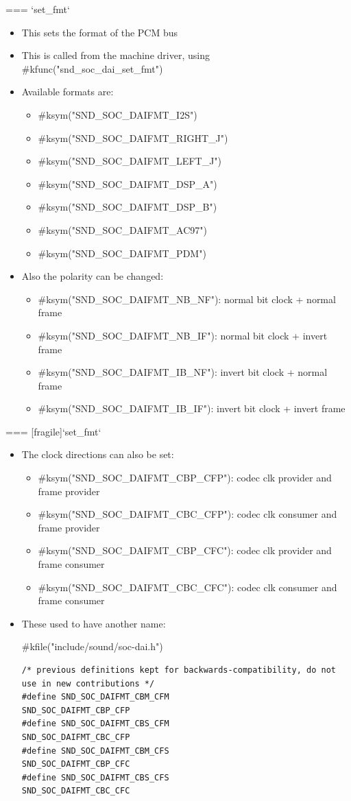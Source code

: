 === {`set_fmt`}
  \begin{itemize}
  \item This sets the format of the PCM bus
  \item This is called from the machine driver, using
    #kfunc("snd_soc_dai_set_fmt")
  \item Available formats are:
    \begin{itemize}
    \item #ksym("SND_SOC_DAIFMT_I2S")
    \item #ksym("SND_SOC_DAIFMT_RIGHT_J")
    \item #ksym("SND_SOC_DAIFMT_LEFT_J")
    \item #ksym("SND_SOC_DAIFMT_DSP_A")
    \item #ksym("SND_SOC_DAIFMT_DSP_B")
    \item #ksym("SND_SOC_DAIFMT_AC97")
    \item #ksym("SND_SOC_DAIFMT_PDM")
    \end{itemize}
  \item Also the polarity can be changed:
    \begin{itemize}
    \item #ksym("SND_SOC_DAIFMT_NB_NF"): normal bit clock + normal frame
    \item #ksym("SND_SOC_DAIFMT_NB_IF"): normal bit clock + invert frame
    \item #ksym("SND_SOC_DAIFMT_IB_NF"): invert bit clock + normal frame
    \item #ksym("SND_SOC_DAIFMT_IB_IF"): invert bit clock + invert frame
    \end{itemize}
  \end{itemize}


=== [fragile]{`set_fmt`}
  \begin{itemize}
  \item The clock directions can also be set:
    \begin{itemize}
    \item #ksym("SND_SOC_DAIFMT_CBP_CFP"): codec clk provider and frame provider
    \item #ksym("SND_SOC_DAIFMT_CBC_CFP"): codec clk consumer and frame provider
    \item #ksym("SND_SOC_DAIFMT_CBP_CFC"): codec clk provider and frame consumer
    \item #ksym("SND_SOC_DAIFMT_CBC_CFC"): codec clk consumer and frame consumer
    \end{itemize}
  \item These used to have another name:
  \begin{block}{#kfile("include/sound/soc-dai.h")}
    \fontsize{9}{9}\selectfont
    \begin{verbatim}
/* previous definitions kept for backwards-compatibility, do not use in new contributions */
#define SND_SOC_DAIFMT_CBM_CFM                SND_SOC_DAIFMT_CBP_CFP
#define SND_SOC_DAIFMT_CBS_CFM                SND_SOC_DAIFMT_CBC_CFP
#define SND_SOC_DAIFMT_CBM_CFS                SND_SOC_DAIFMT_CBP_CFC
#define SND_SOC_DAIFMT_CBS_CFS                SND_SOC_DAIFMT_CBC_CFC
    \end{verbatim}
  \end{block}
  \end{itemize}


